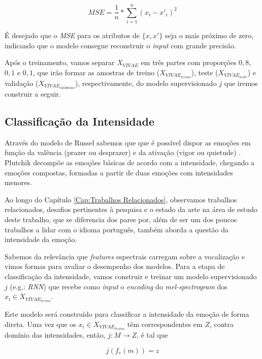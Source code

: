 \begin{equation}
    MSE = \frac{1}{n} * \sum^n_{i=1} (x_i - x'_i)^2
\end{equation}

É desejado que o \textit{MSE} para os atributos de $\{x, x'\}$ seja o mais próximo de zero, indicando que o modelo consegue reconstruir o \textit{input} com grande precisão.

Após o treinamento, vamos separar $X_{VIVAE}$ em três partes com proporções $0,8$, $0,1$ e $0,1$, que irão formar as amostras de treino ($X_{VIVAE_{treino}}$), teste ($X_{VIVAE_{teste}}$) e validação ($X_{VIVAE_{validacao}}$), respectivamente, do modelo supervisionado $j$ que iremos construir a seguir.


\subsection{Classificação da Intensidade}

Através do modelo de Russel sabemos que que é possível dispor as emoções em função da valência (prazer ou desprazer) e da ativação (vigor ou quietude) \cite{27}. Plutchik decompõe as emoções básicas de acordo com a intensidade, chegando a emoções compostas, formadas a partir de duas emoções com intensidades menores.

Ao longo do Capítulo \ref{Cap:Trabalhos Relacionados}, observamos trabalhos relacionados, desafios pertinentes à pesquisa e o estado da arte na área de estudo deste trabalho, que se diferencia dos pares por, além de ser um dos poucos trabalhos a lidar com o idioma português, também aborda a questão da intensidade da emoção.

Sabemos da relevância que \textit{features} espectrais carregam sobre a vocalização e vimos formas para avaliar o desempenho dos modelos. Para a etapa de classificação da intensidade, vamos construir e treinar um modelo supervisionado $j$ (e.g.: \textit{RNN}) que recebe como \textit{input} o \textit{encoding} do \textit{mel-spectrogram} dos $x_i \in X_{VIVAE_{treino}}$.

Este modelo será construído para classificar a intensidade da emoção de forma direta. Uma vez que os $x_i \in X_{VIVAE_{treino}}$ têm correspondentes em $Z$, contra domínio das intensidades, então, $j: M \rightarrow Z$, é tal que

\begin{equation}
    j(f_e(m)) = z
\end{equation}

